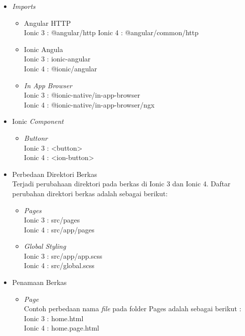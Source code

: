 \begin{enumerate}
\begin{enumerate}
\begin{itemize}
			\item {\it Imports}
			\begin{itemize}
				\item Angular HTTP \\
				Ionic 3 : @angular/http
				Ionic 4 : @angular/common/http
	
				\item Ionic Angula \\
				Ionic 3 : ionic-angular  \\
				Ionic 4 : @ionic/angular
	
				\item {\it In App Browser} \\
				Ionic 3 : @ionic-native/in-app-browser \\
				Ionic 4 : @ionic-native/in-app-browser/ngx
			\end{itemize}
	
			\item Ionic {\it Component}
			\begin{itemize}
				\item {\it Buttonr} \\
				Ionic 3 : <button>  \\
				Ionic 4 : <ion-button>
			\end{itemize}
	
			\item Perbedaan Direktori Berkas \\
			Terjadi perubahaan direktori pada berkas di Ionic 3 dan Ionic 4. Daftar perubahan direktori berkas adalah sebagai berikut:
			\begin{itemize}
				\item {\it Pages} \\
				Ionic 3 : src/pages  \\
				Ionic 4 : src/app/pages
	
				\item {\it Global Styling} \\
				Ionic 3 : src/app/app.scss \\
				Ionic 4 : src/global.scss
			\end{itemize}
	
			\item Penamaan Berkas
			\begin{itemize}
				\item {\it Page} \\
				Contoh perbedaan nama {\it file} pada folder Pages adalah sebagai berikut :
				Ionic 3 : home.html  \\
				Ionic 4 : home.page.html
	

\end{itemize}
\end{itemize}
\end{enumerate}
\end{enumerate}
